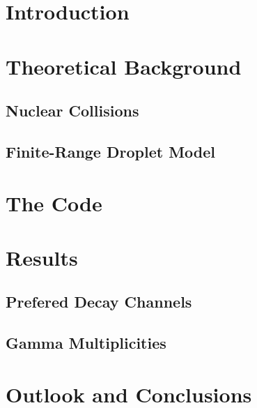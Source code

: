 
\setcounter{page}{1}
\tableofcontents
\clearpage

\pagestyle{scrheadings}
\ofoot[\pagemark]{\pagemark}
\cfoot[]{}

\setlength{\oddsidemargin}{8pt}
\setlength{\evensidemargin}{23pt}

%

\newpage
{}
\setcounter{page}{1}

\chapter{Introduction}
\label{sec:intro}


\chapter{Theoretical Background}
\label{sec:theory}

\section{Nuclear Collisions}
\label{sec:theory:nuc-col}

\section{Finite-Range Droplet Model}
\label{sec:frdm1995}



\chapter{The Code}
\label{sec:code}


\chapter{Results}
\label{sec:results}
\section{Prefered Decay Channels}


\section{Gamma Multiplicities}


\chapter{Outlook and Conclusions}



